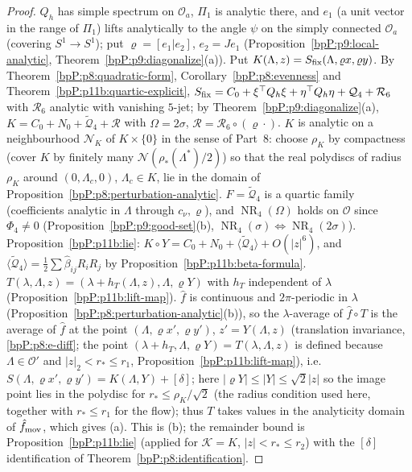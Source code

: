 \begin{proof}
\label{stepP:p11b:bt-rot} $Q_h$ has simple spectrum on $\mathcal O_a$, $\Pi_1$ is analytic there, and $e_1$ (a unit vector in the range of $\Pi_1$) lifts analytically to the angle $\psi$ on the simply connected $\mathcal O_a$ (covering $S^1\to S^1$); put $\varrho=[e_1|e_2]$, $e_2=Je_1$ (Proposition~\ref{bpP:p9:local-analytic}, Theorem~\ref{bpP:p9:diagonalize}(a)).
\label{stepP:p11b:bt-K} Put $K(\Lambda,z)=S_{\rm fix}(\Lambda,\varrho x,\varrho y)$. By Theorem~\ref{bpP:p8:quadratic-form}, Corollary~\ref{bpP:p8:evenness} and Theorem~\ref{bpP:p11b:quartic-explicit}, $S_{\rm fix}=C_0+\xi^\top Q_h\xi+\eta^\top Q_h\eta+\mathcal Q_4+\mathcal R_6$ with $\mathcal R_6$ analytic with vanishing $5$-jet; by Theorem~\ref{bpP:p9:diagonalize}(a), $K=C_0+N_0+\tilde{\mathcal Q}_4+\mathcal R$ with $\Omega=2\sigma$, $\mathcal R=\mathcal R_6\circ(\varrho\cdot)$. $K$ is analytic on a neighbourhood $\mathcal N_K$ of $K\times\{0\}$ in the sense of Part~8: choose $\rho_K$ by compactness (cover $K$ by finitely many $\mathcal N(\rho_*(\Lambda^*)/2)$) so that the real polydiscs of radius $\rho_K$ around $(0,\Lambda_c,0)$, $\Lambda_c\in K$, lie in the domain of Proposition~\ref{bpP:p8:perturbation-analytic}.
\label{stepP:p11b:bt-nf} $F=\tilde{\mathcal Q}_4$ is a quartic family (coefficients analytic in $\Lambda$ through $c_\nu,\varrho$), and $\operatorname{NR}_4(\Omega)$ holds on $\mathcal O$ since $\Phi_4\ne0$ (Proposition~\ref{bpP:p9:good-set}(b), $\operatorname{NR}_4(\sigma)\Leftrightarrow\operatorname{NR}_4(2\sigma)$). Proposition~\ref{bpP:p11b:lie}: $K\circ Y=C_0+N_0+\langle\tilde{\mathcal Q}_4\rangle+O(\lvert z\rvert^6)$, and $\langle\tilde{\mathcal Q}_4\rangle=\tfrac12\sum\hat\beta_{ij}R_iR_j$ by Proposition~\ref{bpP:p11b:beta-formula}.
\label{stepP:p11b:bt-avg} $T(\lambda,\Lambda,z)=(\lambda+h_T(\Lambda,z),\Lambda,\varrho Y)$ with $h_T$ independent of $\lambda$ (Proposition~\ref{bpP:p11b:lift-map}). $\hat f$ is continuous and $2\pi$-periodic in $\lambda$ (Proposition~\ref{bpP:p8:perturbation-analytic}(b)), so the $\lambda$-average of $\hat f\circ T$ is the average of $\hat f$ at the point $(\Lambda,\varrho x',\varrho y')$, $z'=Y(\Lambda,z)$ (translation invariance, \ref{bpP:p8:e-diff}; the point $(\lambda+h_T,\Lambda,\varrho Y)=T(\lambda,\Lambda,z)$ is defined because $\Lambda\in\mathcal O'$ and $\lvert z\rvert_2<r_*\le r_1$, Proposition~\ref{bpP:p11b:lift-map}), i.e.\ $S(\Lambda,\varrho x',\varrho y')=K(\Lambda,Y)+[\delta]$; here $\lvert\varrho Y\rvert\le\lvert Y\rvert\le\sqrt2\lvert z\rvert$ so the image point lies in the polydisc for $r_*\le\rho_K/\sqrt2$ (the radius condition used here, together with $r_*\le r_1$ for the flow); thus $T$ takes values in the analyticity domain of $\hat f_{\rm mov}$, which gives (a). This is (b); the remainder bound is Proposition~\ref{bpP:p11b:lie} (applied for $\mathcal K=K$, $\lvert z\rvert<r_*\le r_2$) with the $[\delta]$ identification of Theorem~\ref{bpP:p8:identification}.

\end{proof}

